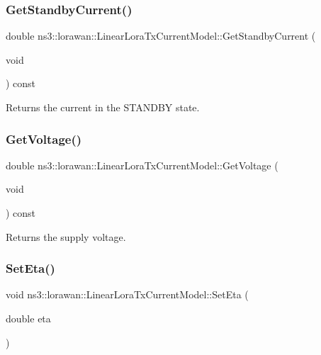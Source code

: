 \subsubsection{\texorpdfstring{Get\+Standby\+Current()}{GetStandbyCurrent()}}
{\footnotesize\ttfamily double ns3\+::lorawan\+::\+Linear\+Lora\+Tx\+Current\+Model\+::\+Get\+Standby\+Current (\begin{DoxyParamCaption}\item[{void}]{ }\end{DoxyParamCaption}) const}

\begin{DoxyReturn}{Returns}
the current in the S\+T\+A\+N\+D\+BY state. 
\end{DoxyReturn}
\mbox{\label{classns3_1_1lorawan_1_1LinearLoraTxCurrentModel_a74f4d04511937d792a90c69997773d95}} 
\subsubsection{\texorpdfstring{Get\+Voltage()}{GetVoltage()}}
{\footnotesize\ttfamily double ns3\+::lorawan\+::\+Linear\+Lora\+Tx\+Current\+Model\+::\+Get\+Voltage (\begin{DoxyParamCaption}\item[{void}]{ }\end{DoxyParamCaption}) const}

\begin{DoxyReturn}{Returns}
the supply voltage. 
\end{DoxyReturn}
\mbox{\label{classns3_1_1lorawan_1_1LinearLoraTxCurrentModel_adde65b755e155cba2f3cf7dd676d19df}} 
\subsubsection{\texorpdfstring{Set\+Eta()}{SetEta()}}
{\footnotesize\ttfamily void ns3\+::lorawan\+::\+Linear\+Lora\+Tx\+Current\+Model\+::\+Set\+Eta (\begin{DoxyParamCaption}\item[{double}]{eta }\end{DoxyParamCaption})}


